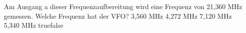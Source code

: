     {Am Ausgang a dieser Frequenzaufbereitung wird eine Frequenz von 21,360 MHz gemessen. Welche Frequenz hat der VFO?}
    {3,560 MHz}
    {4,272 MHz}
    {7,120 MHz}
    {5,340 MHz}
    {true}{false}